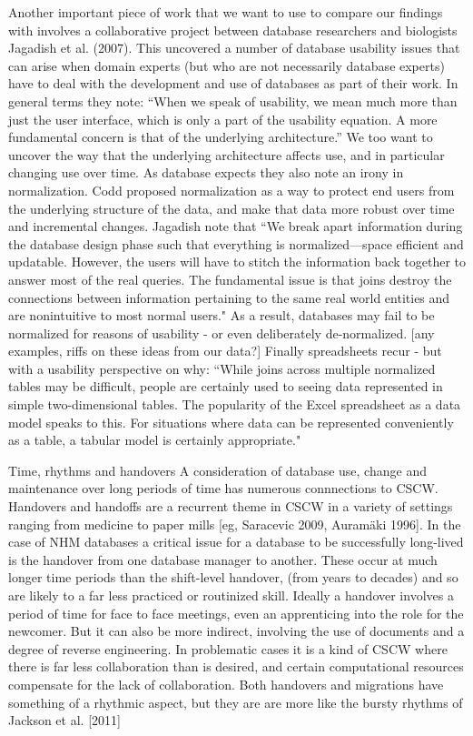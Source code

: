 Another important piece of work that we want to use to compare our findings with involves a collaborative project between database researchers and biologists Jagadish et al. (2007). This uncovered a number of database usability issues that can arise when domain experts (but who are not necessarily  database experts) have to deal with the development and use of databases as part of their work. In general terms they note: “When we speak of usability, we mean much more than just the user interface, which is only a part of the usability equation. A more fundamental concern is that of the underlying architecture.” We too want to uncover the way that the underlying architecture affects use, and in particular changing use over time. As database expects they also note an irony in normalization. Codd proposed normalization as a way to protect end users from the underlying structure of the data, and make that data more robust over time and incremental changes. Jagadish note that “We break apart information during the database design phase such that everything is normalized—space efficient and updatable. However, the users will have to stitch the information back together to answer most of the real queries. The fundamental issue is that joins destroy the connections between information pertaining to the same real world entities and are nonintuitive to most normal users." As a result, databases may fail to be normalized for reasons of usability - or even deliberately de-normalized. [any examples, riffs on these ideas from our data?] Finally spreadsheets recur - but with a usability perspective on why: “While joins across multiple normalized tables may be difficult, people are certainly used to seeing data represented in simple two-dimensional tables. The popularity of the Excel spreadsheet as a data model speaks to this. For situations where data can be represented conveniently as a table, a tabular model is certainly appropriate."

Time, rhythms and handovers
A consideration of database use, change and maintenance over long periods of time has numerous connnections to CSCW. Handovers and handoffs are a recurrent theme in CSCW in a variety of settings ranging from medicine to paper mills [eg, Saracevic 2009, Auramäki 1996]. In the case of NHM databases a critical issue for a database to be successfully long-lived is the handover from one database manager to another. These occur at much longer time periods than the shift-level handover, (from years to decades) and so are likely to a far less practiced or routinized skill. Ideally a handover involves a period of time for face to face meetings, even an apprenticing into the role for the newcomer. But it can also be more indirect, involving the use of documents and a degree of reverse engineering. In problematic cases it is a kind of CSCW where there is far less collaboration than is desired, and certain computational resources compensate for the lack of collaboration. Both handovers and migrations have something of a rhythmic aspect, but they are are more like the bursty rhythms of Jackson et al. [2011]

